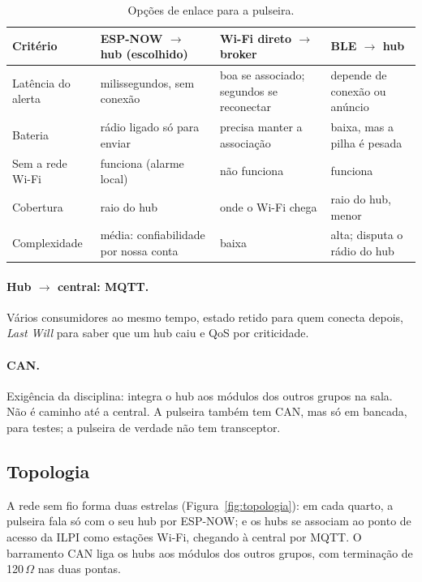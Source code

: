 \begin{table}[H]
\centering
\caption{Opções de enlace para a pulseira.}
\label{tab:enlaces}
\small
\begin{tabular}{@{}>{\raggedright\arraybackslash}p{2.6cm}>{\raggedright\arraybackslash}p{3.9cm}>{\raggedright\arraybackslash}p{3.8cm}>{\raggedright\arraybackslash}p{3.6cm}@{}}
\toprule
Critério & \textbf{ESP-NOW $\to$ hub} (escolhido) & Wi-Fi direto $\to$ broker & BLE $\to$ hub \\
\midrule
Latência do alerta & milissegundos, sem conexão & boa se associado; segundos se reconectar & depende de conexão ou anúncio \\
Bateria & rádio ligado só para enviar & precisa manter a associação & baixa, mas a pilha é pesada \\
Sem a rede Wi-Fi & funciona (alarme local) & não funciona & funciona \\
Cobertura & raio do hub & onde o Wi-Fi chega & raio do hub, menor \\
Complexidade & média: confiabilidade por nossa conta & baixa & alta; disputa o rádio do hub \\
\bottomrule
\end{tabular}
\end{table}

\paragraph{Hub $\to$ central: MQTT.} Vários consumidores ao mesmo tempo, estado retido para
quem conecta depois, \textit{Last Will} para saber que um hub caiu e QoS por criticidade.

\paragraph{CAN.} Exigência da disciplina: integra o hub aos módulos dos outros grupos na
sala. Não é caminho até a central. A pulseira também tem CAN, mas só em bancada, para
testes; a pulseira de verdade não tem transceptor.

\subsection{Topologia}

A rede sem fio forma duas estrelas (Figura~\ref{fig:topologia}): em cada quarto, a pulseira
fala só com o seu hub por ESP-NOW; e os hubs se associam ao ponto de acesso da ILPI como
estações Wi-Fi, chegando à central por MQTT. O barramento CAN liga os hubs aos módulos dos
outros grupos, com terminação de 120\,$\Omega$ nas duas pontas.

